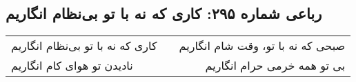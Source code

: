 \begin{center}
\section*{رباعی شماره ۲۹۵: کاری که نه با تو بی‌نظام انگاریم}
\label{sec:sh295}
\begin{longtable}{l p{0.5cm} r}
کاری که نه با تو بی‌نظام انگاریم
&&
صبحی که نه با تو، وقت شام انگاریم
\\
نادیدن تو هوای کام انگاریم
&&
بی تو همه خرمی حرام انگاریم
\\
\end{longtable}
\end{center}

